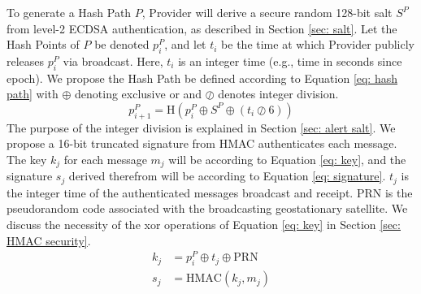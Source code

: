 \documentclass[letterpaper,times]{IONconf/IONconf}
\begin{document}
To generate a Hash Path $P$, Provider will derive a secure random 128-bit salt $S^P$ from level-2 ECDSA authentication, as described in Section \ref{sec: salt}.
Let the Hash Points of $P$ be denoted $p^P_i$, and let $t_i$ be the time at which Provider publicly releases $p^P_i$ via broadcast.
Here, $t_i$ is an integer time (e.g., time in seconds since epoch).
We propose the Hash Path be defined according to Equation \eqref{eq: hash path} with $\oplus$ denoting exclusive or and $\oslash$ denotes integer division.
\begin{equation}\label{eq: hash path}
p^P_{i+1} = \textrm{H} \left(p^P_i \oplus S^P \oplus (t_i \oslash 6) \right)
\end{equation}
The purpose of the integer division is explained in Section \ref{sec: alert salt}.
We propose a 16-bit truncated signature from HMAC authenticates each message.
The key $k_j$ for each message $m_j$ will be according to Equation \ref{eq: key}, and the signature $s_j$ derived therefrom will be according to Equation \eqref{eq: signature}.
$t_j$ is the integer time of the authenticated messages broadcast and receipt.
PRN is the pseudorandom code associated with the broadcasting geostationary satellite.
We discuss the necessity of the xor operations of Equation \eqref{eq: key} in Section \ref{sec: HMAC security}.
\begin{align} 
k_j &= p^P_i \oplus t_j \oplus \textrm{PRN} \label{eq: key} \\
s_j &= \textrm{HMAC}(k_j, m_j) \label{eq: signature}
\end{align}
\end{document}

